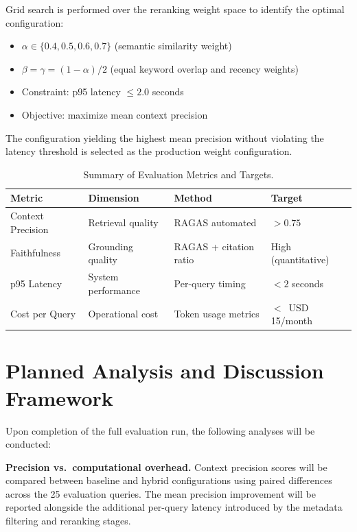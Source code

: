 \documentclass[12pt,a4paper]{report}
\begin{document}
Grid search is performed over the reranking weight space to identify the optimal configuration:

\begin{itemize}[leftmargin=0.5in]
  \item $\alpha \in \{0.4, 0.5, 0.6, 0.7\}$ (semantic similarity weight)
  \item $\beta = \gamma = (1 - \alpha) / 2$ (equal keyword overlap and recency weights)
  \item Constraint: p95 latency $\leq 2.0$ seconds
  \item Objective: maximize mean context precision
\end{itemize}

The configuration yielding the highest mean precision without violating the latency threshold is selected as the production weight configuration.

\begin{table}[H]
\caption{Summary of Evaluation Metrics and Targets.}
\label{tab:eval_targets}
\centering
\begin{tabular}{p{3.0cm}p{3.0cm}p{3.2cm}p{3.0cm}}
\toprule
\textbf{Metric} & \textbf{Dimension} & \textbf{Method} & \textbf{Target} \\
\midrule
Context Precision & Retrieval quality & RAGAS automated & $> 0.75$ \\
Faithfulness & Grounding quality & RAGAS + citation ratio & High (quantitative) \\
p95 Latency & System performance & Per-query timing & $< 2$ seconds \\
Cost per Query & Operational cost & Token usage metrics & $<$~USD 15/month \\
\bottomrule
\end{tabular}
\end{table}

\section{Planned Analysis and Discussion Framework}
\label{sec:discussion}

Upon completion of the full evaluation run, the following analyses will be conducted:

\textbf{Precision vs.\ computational overhead.} Context precision scores will be compared between baseline and hybrid configurations using paired differences across the 25 evaluation queries. The mean precision improvement will be reported alongside the additional per-query latency introduced by the metadata filtering and reranking stages.
\end{document}
